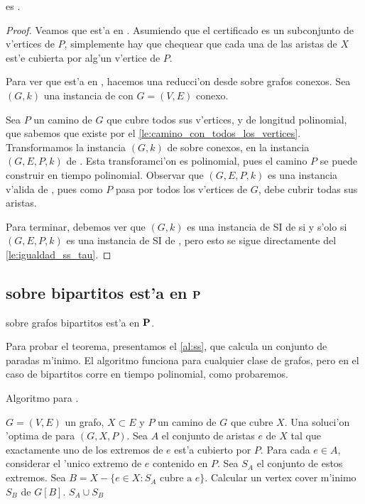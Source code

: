 \begin{theorem}
\label{th:ss_npc}
 es .

\begin{proof}
Veamos que  est'a en . Asumiendo que el certificado es un subconjunto de v'ertices de $P$, simplemente hay que chequear que cada una de las aristas de $X$ est'e cubierta por alg'un v'ertice de $P$.

Para ver que est'a en , hacemos una reducci'on desde  sobre grafos conexos. Sea $(G, k)$ una instancia de  con $G = (V, E)$ conexo.

Sea $P$ un camino de $G$ que cubre todos sus v'ertices, y de longitud polinomial, que sabemos que existe por el \autoref{le:camino_con_todos_los_vertices}. Transformamos la instancia $(G, k)$ de  sobre conexos, en la instancia $(G, E, P, k)$ de . Esta transforamci'on es polinomial, pues el camino $P$ se puede construir en tiempo polinomial. Observar que $(G, E, P, k)$ es una instancia v'alida de , pues como $P$ pasa por todos los v'ertices de $G$, debe cubrir todas sus aristas.

Para terminar, debemos ver que $(G, k)$ es una instancia de SI de  si y s'olo si $(G, E, P, k)$ es una instancia de SI de , pero esto se sigue directamente del \autoref{le:igualdad_ss_tau}.
\end{proof}
\end{theorem}

\subsection{ sobre bipartitos est'a en $\textnormal{\textbf{P}}$}

\begin{theorem}
\label{th:ss_bipartitos_p}
 sobre grafos bipartitos est'a en $\textnormal{\textbf{P}}$.
\end{theorem}

Para probar el teorema, presentamos el \autoref{al:ss}, que calcula un conjunto de paradas m'inimo. El algoritmo funciona para cualquier clase de grafos, pero en el caso de bipartitos corre en tiempo polinomial, como probaremos.

\begin{algorithm}
  \caption{Algoritmo para .}
  \label{al:ss}
  \begin{algorithmic}[1]
  	\Require $G = (V, E)$ un grafo, $X \subset E$ y $P$ un camino de $G$ que cubre $X$.
  	\Ensure Una soluci'on 'optima de  para $(G, X, P)$.
  	\State Sea $A$ el conjunto de aristas $e$ de $X$ tal que exactamente uno de los extremos de $e$ est'a cubierto por $P$.
  	\State Para cada $e \in A$, considerar el 'unico extremo de $e$ contenido en $P$. Sea $S_A$ el conjunto de estos extremos.
	\State Sea $B = X - \{e \in X : S_A \text{ cubre a }e \}$. Calcular un vertex cover m'inimo $S_B$ de $G[B]$.
	\Return $S_A \cup S_B$
  \end{algorithmic}
\end{algorithm}

